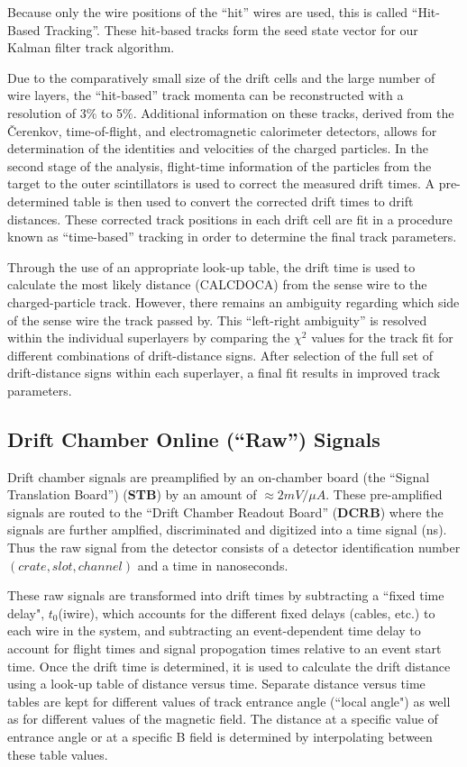 \documentclass{article}
\begin{document}
Because only the wire positions of
the ``hit'' wires are used, this is called ``Hit-Based Tracking''.
These hit-based tracks form the seed state vector for our Kalman filter track
algorithm.

Due to the comparatively small size of the drift cells and the large 
number of wire layers, the ``hit-based'' track momenta can be reconstructed with a 
resolution of 3$\%$ to 5$\%$.  Additional information on these tracks, derived
from the {\v C}erenkov, time-of-flight, and electromagnetic calorimeter 
detectors, allows for determination of the identities and velocities of the 
charged particles.  In the second stage of the analysis, flight-time 
information of the particles from the target to the outer scintillators is 
used to correct the measured drift times.  A pre-determined table is then used
to convert the corrected drift times to drift distances.  These corrected 
track positions in each drift cell are fit in a procedure known as 
``time-based'' tracking in order to determine the final track parameters.

Through the use of an appropriate look-up table, the drift time is used to 
calculate the most likely 
distance (CALCDOCA) from the sense wire to the charged-particle track.  
However, there remains an ambiguity regarding which side of the sense 
wire the track passed by.  This ``left-right ambiguity'' is resolved within 
the individual superlayers by comparing the $\chi^2$ values for the track fit 
for different combinations of drift-distance signs.  After selection of 
the full set of drift-distance signs within each superlayer, a final fit 
results in improved track parameters.

\subsection{Drift Chamber Online (``Raw'') Signals}
\label{sec:rawsignals}

Drift chamber signals are preamplified by an on-chamber board (the ``Signal
Translation Board'') ({\bf STB}) by an amount of $\approx 2 mV/\mu A$.
These pre-amplified signals are routed to the ``Drift Chamber Readout Board'' 
({\bf DCRB}) where the signals are further amplfied, discriminated and digitized into
a time signal (ns).  Thus the raw signal from the detector consists of
a detector identification number $(crate,slot,channel)$ and a time in nanoseconds.

These raw signals are transformed into drift times by subtracting a ``fixed time delay", 
$t_0$(iwire), which accounts for the different fixed delays (cables, etc.)
to each wire in the system, and subtracting an event-dependent time
delay to account for flight times and signal propogation times relative
to an event start time.  Once the drift time is determined, it is used
to calculate the drift distance using a look-up table of distance
versus time.  Separate distance versus time tables are kept for different
values of track entrance angle (``local angle") as well as for different
values of the magnetic field.  The distance at a specific value of entrance
angle or at a specific B field is determined by interpolating between
these table values.
\end{document}
